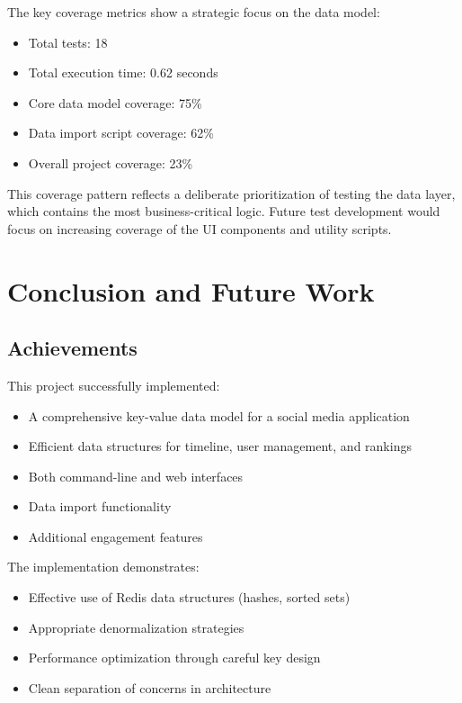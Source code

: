 \documentclass[a4paper,11pt]{article}
\begin{document}
The key coverage metrics show a strategic focus on the data model:

\begin{itemize}
    \item Total tests: 18
    \item Total execution time: 0.62 seconds
    \item Core data model coverage: 75\%
    \item Data import script coverage: 62\%
    \item Overall project coverage: 23\%
\end{itemize}

This coverage pattern reflects a deliberate prioritization of testing the data layer, which contains the most business-critical logic. Future test development would focus on increasing coverage of the UI components and utility scripts.

\newpage
\section{Conclusion and Future Work}

\subsection{Achievements}
This project successfully implemented:

\begin{itemize}
    \item A comprehensive key-value data model for a social media application
    \item Efficient data structures for timeline, user management, and rankings
    \item Both command-line and web interfaces
    \item Data import functionality
    \item Additional engagement features
\end{itemize}

The implementation demonstrates:

\begin{itemize}
    \item Effective use of Redis data structures (hashes, sorted sets)
    \item Appropriate denormalization strategies
    \item Performance optimization through careful key design
    \item Clean separation of concerns in architecture
\end{itemize}
\end{document}

